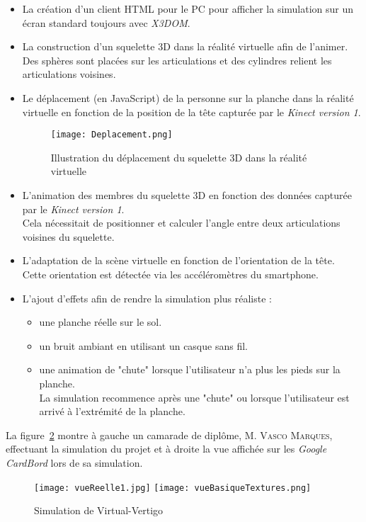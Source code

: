 \begin{itemize}
\item La création d'un client HTML pour le PC pour afficher la simulation sur un écran standard toujours avec \textit{X3DOM}.
\item La construction d'un squelette 3D dans la réalité virtuelle afin de l'animer. \\
Des sphères sont placées sur les articulations et des cylindres relient les articulations voisines.
\item Le déplacement (en \textsf{JavaScript}) de la personne sur la planche dans la réalité virtuelle en fonction de la position de la tête capturée par le \textit{Kinect version 1}.
\begin{figure}[H]
\centering
\texttt{[image: Deplacement.png]}
\caption{\label{Deplacement} Illustration du déplacement du squelette 3D dans la réalité virtuelle}
\end{figure}

\item L'animation des membres du squelette 3D en fonction des données capturée par le \textit{Kinect version 1}. \\
Cela nécessitait de positionner et calculer l'angle entre deux articulations voisines du squelette.
\item L'adaptation de la scène virtuelle en fonction de l'orientation de la tête. \\
Cette orientation est détectée via les accéléromètres du \textsf{smartphone}.
\item L'ajout d'effets afin de rendre la simulation plus réaliste : \\
\begin{itemize}
\item une planche réelle sur le sol.
\item un bruit ambiant en utilisant un casque sans fil.
\item une animation de "chute" lorsque l'utilisateur n'a plus les pieds sur la planche. \\
La simulation recommence après une "chute" ou lorsque l'utilisateur est arrivé à l'extrémité de la planche.
\end{itemize}
\end{itemize}

La figure~\ref{simulation} montre à gauche un camarade de diplôme, \textsc{M. Vasco Marques}, effectuant la simulation du projet et à droite la vue affichée sur les \textit{Google CardBord} lors de sa simulation.
\begin{figure}[H]
\centering
	\texttt{[image: vueReelle1.jpg]}
	\texttt{[image: vueBasiqueTextures.png]}
\caption{\label{simulation} Simulation de Virtual-Vertigo}
\end{figure}

